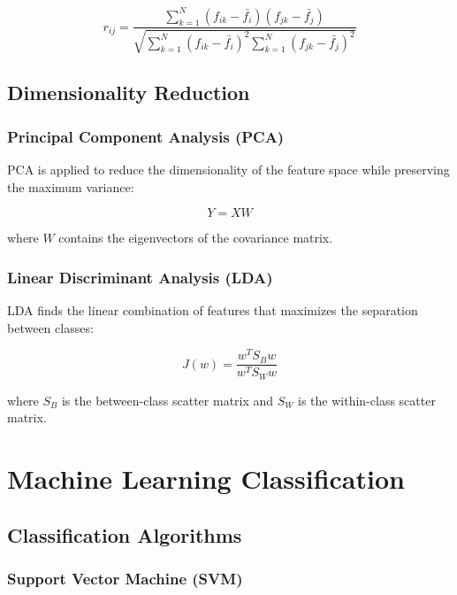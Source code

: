 \begin{equation}
r_{ij} = \frac{\sum_{k=1}^{N} (f_{ik} - \bar{f_i})(f_{jk} - \bar{f_j})}{\sqrt{\sum_{k=1}^{N} (f_{ik} - \bar{f_i})^2 \sum_{k=1}^{N} (f_{jk} - \bar{f_j})^2}}
\end{equation}

\subsection{Dimensionality Reduction}

\subsubsection{Principal Component Analysis (PCA)}

PCA is applied to reduce the dimensionality of the feature space while preserving the maximum variance:

\begin{equation}
Y = XW
\end{equation}

where $W$ contains the eigenvectors of the covariance matrix.

\subsubsection{Linear Discriminant Analysis (LDA)}

LDA finds the linear combination of features that maximizes the separation between classes:

\begin{equation}
J(w) = \frac{w^T S_B w}{w^T S_W w}
\end{equation}

where $S_B$ is the between-class scatter matrix and $S_W$ is the within-class scatter matrix.

\section{Machine Learning Classification}

\subsection{Classification Algorithms}

\subsubsection{Support Vector Machine (SVM)}

